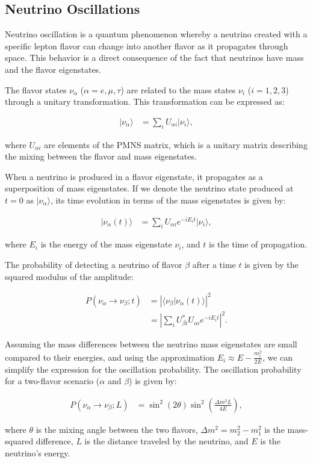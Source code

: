 \subsection{Neutrino Oscillations}

Neutrino oscillation is a quantum phenomenon whereby a neutrino created with a specific lepton flavor can change into another flavor as it propagates through space.
This behavior is a direct consequence of the fact that neutrinos have mass and the flavor eigenstates.


The flavor states \(\nu_\alpha\) (\(\alpha = e, \mu, \tau\)) are related to the mass states \(\nu_i\) (\(i = 1, 2, 3\)) through a unitary transformation.
This transformation can be expressed as:

\begin{align}
|\nu_\alpha\rangle &= \sum_{i} U_{\alpha i} |\nu_i\rangle,
\end{align}

where \(U_{\alpha i}\) are elements of the PMNS matrix, which is a unitary matrix describing the mixing between the flavor and mass eigenstates.

When a neutrino is produced in a flavor eigenstate, it propagates as a superposition of mass eigenstates.
If we denote the neutrino state produced at \(t = 0\) as \(|\nu_\alpha\rangle\), its time evolution in terms of the mass eigenstates is given by:

\begin{align}
|\nu_\alpha(t)\rangle &= \sum_{i} U_{\alpha i} e^{-i E_i t} |\nu_i\rangle,
\end{align}

where \(E_i\) is the energy of the mass eigenstate \(\nu_i\), and \(t\) is the time of propagation.

The probability of detecting a neutrino of flavor \(\beta\) after a time \(t\) is given by the squared modulus of the amplitude:

\begin{align}
P(\nu_\alpha \to \nu_\beta; t) &= \left| \langle \nu_\beta | \nu_\alpha(t) \rangle \right|^2 \\
&= \left| \sum_{i} U_{\beta i}^* U_{\alpha i} e^{-i E_i t} \right|^2.
\end{align}

Assuming the mass differences between the neutrino mass eigenstates are small compared to their energies, and using the approximation \(E_i \approx E - \frac{m_i^2}{2E}\), we can simplify the expression for the oscillation probability.
The oscillation probability for a two-flavor scenario (\(\alpha\) and \(\beta\)) is given by:

\begin{align}
P(\nu_\alpha \to \nu_\beta; L) &= \sin^2(2\theta) \sin^2\left(\frac{\Delta m^2 L}{4 E}\right),
\end{align}

where \(\theta\) is the mixing angle between the two flavors, \(\Delta m^2 = m_2^2 - m_1^2\) is the mass-squared difference, \(L\) is the distance traveled by the neutrino, and \(E\) is the neutrino's energy.
